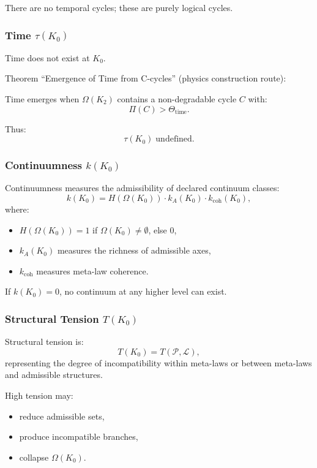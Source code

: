 There are no temporal cycles; these are purely logical cycles.

\subsubsection{Time \texorpdfstring{$\tau(K_0)$}{\tau(K_0)}}

Time does not exist at $K_0$.

Theorem “Emergence of Time from C-cycles” (physics construction route):

Time emerges when $\Omega(K_2)$ contains a non-degradable cycle
$C$ with:
\[
\Pi(C) > \Theta_{\mathrm{time}}.
\]

Thus:
\[
\tau(K_0) \;\text{undefined}.
\]

\subsubsection{Continuumness \texorpdfstring{$k(K_0)$}{k(K_0)}}

Continuumness measures the admissibility of declared continuum classes:
\[
k(K_0) =
H(\Omega(K_0)) \cdot
k_A(K_0) \cdot
k_{\mathrm{coh}}(K_0),
\]
where:
\begin{itemize}
    \item $H(\Omega(K_0)) = 1$ if $\Omega(K_0)\neq\emptyset$, else $0$,
    \item $k_A(K_0)$ measures the richness of admissible axes,
    \item $k_{\mathrm{coh}}$ measures meta-law coherence.
\end{itemize}

If $k(K_0)=0$, no continuum at any higher level can exist.

\subsubsection{Structural Tension \texorpdfstring{$T(K_0)$}{T(K_0)}}

Structural tension is:
\[
T(K_0) = T(\mathcal{P}, \mathcal{L}),
\]
representing the degree of incompatibility within meta-laws or between
meta-laws and admissible structures.

High tension may:
\begin{itemize}
    \item reduce admissible sets,
    \item produce incompatible branches,
    \item collapse $\Omega(K_0)$.
\end{itemize}

